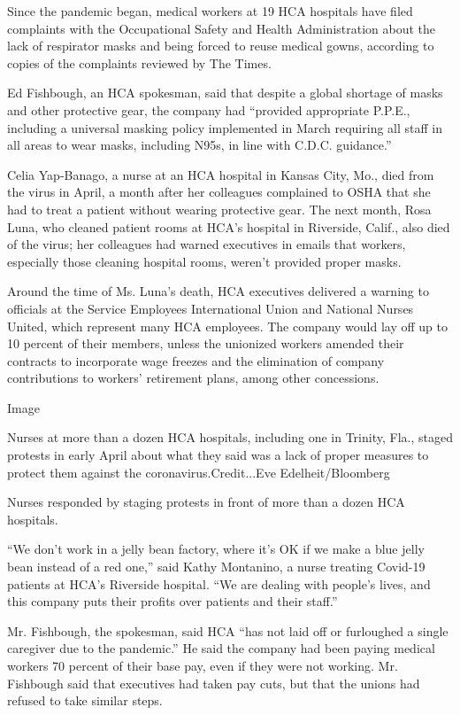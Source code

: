 Since the pandemic began, medical workers at 19 HCA hospitals have filed
complaints with the Occupational Safety and Health Administration about
the lack of respirator masks and being forced to reuse medical gowns,
according to copies of the complaints reviewed by The Times.

Ed Fishbough, an HCA spokesman, said that despite a global shortage of
masks and other protective gear, the company had ``provided appropriate
P.P.E., including a universal masking policy implemented in March
requiring all staff in all areas to wear masks, including N95s, in line
with C.D.C. guidance.''

Celia Yap-Banago, a nurse at an HCA hospital in Kansas City, Mo., died
from the virus in April, a month after her colleagues complained to OSHA
that she had to treat a patient without wearing protective gear. The
next month, Rosa Luna, who cleaned patient rooms at HCA's hospital in
Riverside, Calif., also died of the virus; her colleagues had warned
executives in emails that workers, especially those cleaning hospital
rooms, weren't provided proper masks.

Around the time of Ms. Luna's death, HCA executives delivered a warning
to officials at the Service Employees International Union and National
Nurses United, which represent many HCA employees. The company would lay
off up to 10 percent of their members, unless the unionized workers
amended their contracts to incorporate wage freezes and the elimination
of company contributions to workers' retirement plans, among other
concessions.

Image

Nurses at more than a dozen HCA hospitals, including one in Trinity,
Fla., staged protests in early April about what they said was a lack of
proper measures to protect them against the coronavirus.Credit...Eve
Edelheit/Bloomberg

Nurses responded by staging protests in front of more than a dozen HCA
hospitals.

``We don't work in a jelly bean factory, where it's OK if we make a blue
jelly bean instead of a red one,'' said Kathy Montanino, a nurse
treating Covid-19 patients at HCA's Riverside hospital. ``We are dealing
with people's lives, and this company puts their profits over patients
and their staff.''

Mr. Fishbough, the spokesman, said HCA ``has not laid off or furloughed
a single caregiver due to the pandemic.'' He said the company had been
paying medical workers 70 percent of their base pay, even if they were
not working. Mr. Fishbough said that executives had taken pay cuts, but
that the unions had refused to take similar steps.

